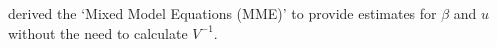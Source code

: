 \documentclass[12pt, a4paper]{report}
\theoremstyle{plain}
\theoremstyle{definition}
\theoremstyle{remark}
\begin{document}









\citet{Henderson50, Henderson63, Henderson73, Henderson84a}
derived the `Mixed Model Equations (MME)' to provide estimates for
$\beta$ and $u$ without the need to calculate $V^{-1}$.

\end{document}
